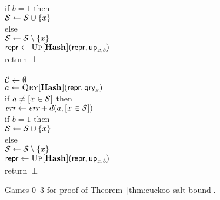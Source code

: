 \begin{figure*}
{      if $b = 1$ then\\
      \tab $\mathcal{S} \gets \mathcal{S} \cup \{x\}$\\
      else\\
      \tab $\mathcal{S} \gets \mathcal{S} \setminus \{x\}$\\
      $\mathsf{repr} \gets \textsc{Up}[\mathbf{Hash}\hspace{0.5pt}](\mathsf{repr},\mathsf{up}_{x,b})$\\
      return~$\bot$
    \\[6pt]
    \\[2pt]
      $\mathcal{C} \gets \emptyset$\\
      $a \gets \textsc{Qry}[\mathbf{Hash}\hspace{0.5pt}](\mathsf{repr}, \mathsf{qry}_x)$\\
      if $a \neq [x \in \mathcal{S}]$ then\\
      \tab $\textit{err} \gets \textit{err}+d(a,[x \in \mathcal{S}])$\\
      if $b = 1$ then\\
      \tab $\mathcal{S} \gets \mathcal{S} \cup \{x\}$\\
      else\\
      \tab $\mathcal{S} \gets \mathcal{S} \setminus \{x\}$\\
      $\mathsf{repr} \gets \textsc{Up}[\mathbf{Hash}\hspace{0.5pt}](\mathsf{repr},\mathsf{up}_{x,b})$\\
      return~$\bot$
  }
  {
  }
  {
  }
  \caption{Games 0--3 for proof of Theorem~\ref{thm:cuckoo-salt-bound}.}
  \label{fig:cuckoo-salt-bound}
\end{figure*}

